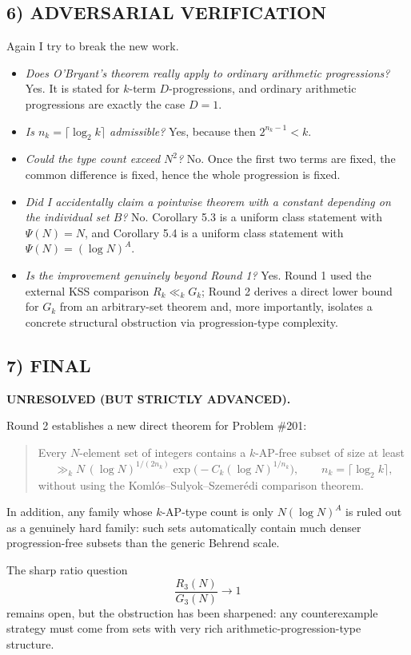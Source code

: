 \subsection*{6) ADVERSARIAL VERIFICATION}
Again I try to break the new work.
\begin{itemize}
\item \emph{Does O'Bryant's theorem really apply to ordinary arithmetic progressions?}  Yes.  It is stated for $k$-term $D$-progressions, and ordinary arithmetic progressions are exactly the case $D=1$.
\item \emph{Is $n_k=\lceil \log_2 k\rceil$ admissible?}  Yes, because then $2^{n_k-1}<k$.
\item \emph{Could the type count exceed $N^2$?}  No.  Once the first two terms are fixed, the common difference is fixed, hence the whole progression is fixed.
\item \emph{Did I accidentally claim a pointwise theorem with a constant depending on the individual set $B$?}  No.  Corollary 5.3 is a uniform class statement with $\Psi(N)=N$, and Corollary 5.4 is a uniform class statement with $\Psi(N)=(\log N)^A$.
\item \emph{Is the improvement genuinely beyond Round 1?}  Yes.  Round 1 used the external KSS comparison $R_k\ll_k G_k$; Round 2 derives a direct lower bound for $G_k$ from an arbitrary-set theorem and, more importantly, isolates a concrete structural obstruction via progression-type complexity.
\end{itemize}

\subsection*{7) FINAL}
\textbf{UNRESOLVED (BUT STRICTLY ADVANCED).}

Round 2 establishes a new direct theorem for Problem \#201:
\begin{quote}
Every $N$-element set of integers contains a $k$-AP-free subset of size at least
\[
\gg_k N\, (\log N)^{1/(2n_k)}\exp\!\bigl(-C_k(\log N)^{1/n_k}\bigr),
\qquad n_k=\lceil \log_2 k\rceil,
\]
without using the Koml\'os--Sulyok--Szemer\'edi comparison theorem.
\end{quote}
In addition, any family whose $k$-AP-type count is only $N(\log N)^A$ is ruled out as a genuinely hard family: such sets automatically contain much denser progression-free subsets than the generic Behrend scale.

The sharp ratio question
\[
\frac{R_3(N)}{G_3(N)}\to 1
\]
remains open, but the obstruction has been sharpened: any counterexample strategy must come from sets with very rich arithmetic-progression-type structure.


